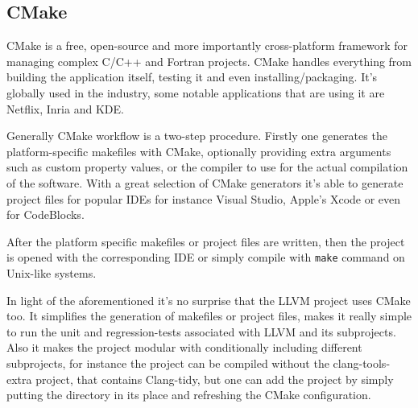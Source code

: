 \subsection{CMake}
\par CMake is a free, open-source and more importantly cross-platform framework for managing complex C/C++ and Fortran projects. CMake handles everything from building the application itself, testing it and even installing/packaging. It's globally used in the industry, some notable applications that are using it are Netflix, Inria and KDE\cite{cmake_homepage}. \medskip
\par Generally CMake workflow is a two-step procedure. Firstly one generates the platform-specific makefiles with CMake, optionally providing extra arguments such as custom property values, or the compiler to use for the actual compilation of the software. With a great selection of CMake generators it's able to generate project files for popular IDEs for instance Visual Studio, Apple's Xcode or even for CodeBlocks\cite{cmake_generator_doc}. 
\par After the platform specific makefiles or project files are written, then the project is opened with the corresponding IDE or simply compile with \verb|make| command on Unix-like systems.
\par In light of the aforementioned it's no surprise that the LLVM project uses CMake too. It simplifies the generation of makefiles or project files, makes it really simple to run the unit and regression-tests associated with LLVM and its subprojects. Also it makes the project modular with conditionally including different subprojects, for instance the project can be compiled without the clang-tools-extra project, that contains Clang-tidy, but one can add the project by simply putting the directory in its place and refreshing the CMake configuration. 